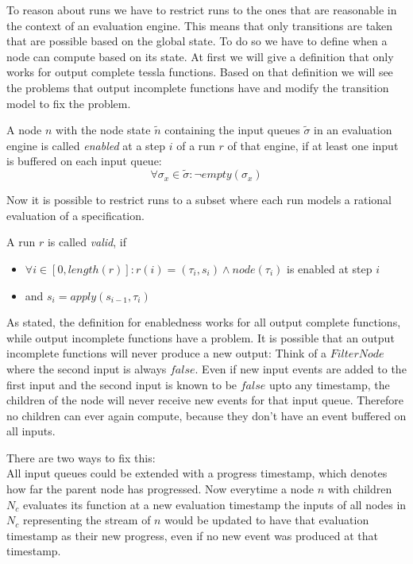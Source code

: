 To reason about runs we have to restrict runs to the ones that are reasonable in the context of an evaluation engine.
This means that only transitions are taken that are possible based on the global state.
To do so we have to define when a node can compute based on its state.
At first we will give a definition that only works for output complete \gls{tessla} functions.
Based on that definition we will see the problems that output incomplete functions have and modify the transition model to fix the problem.

\begin{definition}[name = Enabledness of a Node]\label{def:node_enabled}
  A node \(n\) with the node state \(\widetilde{n}\) containing the input queues \(\widetilde{\sigma}\) in an evaluation engine is called \emph{enabled} at a step \(i\) of a run \(r\) of that engine, if at least one input is buffered on each input queue:
  \[\forall \sigma_x \in \widetilde{\sigma}: \neg \mathit{empty}(\sigma_x)\]
\end{definition}

Now it is possible to restrict runs to a subset where each run models a rational evaluation of a specification.

\begin{definition}[name = Valid Run]\label{def:valid_run}
  A run \(r\) is called \emph{valid}, if
  \begin{itemize}
    \item \(\forall i \in [0,\mathit{length}(r)]: r(i) = (\tau_i,s_i) \land \mathit{node}(\tau_i)\) is enabled at step \(i\)
    \item and \(s_i = \mathit{apply}(s_{i-1}, \tau_i)\)
  \end{itemize}
\end{definition}

As stated, the definition for enabledness works for all output complete functions, while output incomplete functions have a problem.
It is possible that an output incomplete functions will never produce a new output:
Think of a \(\mathit{FilterNode}\) where the second input is always \(\mathit{false}\).
Even if new input events are added to the first input and the second input is known to be \(\mathit{false}\) upto any timestamp, the children of the node will never receive new events for that input queue.
Therefore no children can ever again compute, because they don't have an event buffered on all inputs.

There are two ways to fix this:\\
All input queues could be extended with a progress timestamp, which denotes how far the parent node has progressed.
Now everytime a node \(n\) with children \(N_c\) evaluates its function at a new evaluation timestamp the inputs of all nodes in \(N_c\) representing the stream of \(n\) would be updated to have that evaluation timestamp as their new progress, even if no new event was produced at that timestamp.


